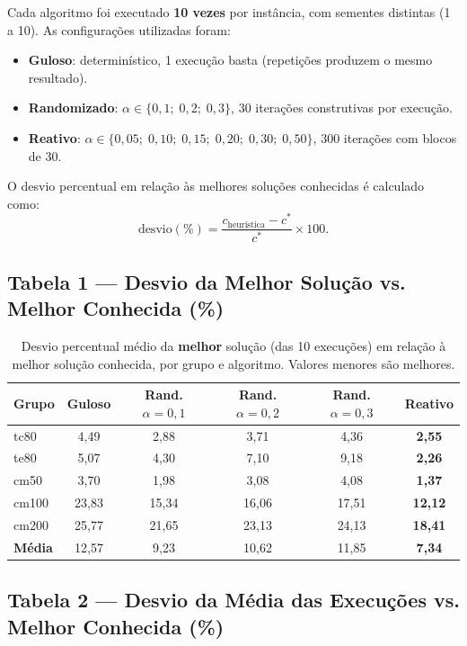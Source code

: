 \documentclass[12pt, a4paper]{article}
\begin{document}
Cada algoritmo foi executado \textbf{10 vezes} por instância, com sementes distintas (1 a 10). As configurações utilizadas foram:

\begin{itemize}
    \item \textbf{Guloso}: determinístico, 1 execução basta (repetições produzem o mesmo resultado).
    \item \textbf{Randomizado}: $\alpha \in \{0{,}1;\; 0{,}2;\; 0{,}3\}$, 30 iterações construtivas por execução.
    \item \textbf{Reativo}: $\alpha \in \{0{,}05;\; 0{,}10;\; 0{,}15;\; 0{,}20;\; 0{,}30;\; 0{,}50\}$, 300 iterações com blocos de 30.
\end{itemize}

O desvio percentual em relação às melhores soluções conhecidas \cite{ruiz2015} é calculado como:
\[
\text{desvio}(\%) = \frac{c_{\text{heurística}} - c^*}{c^*} \times 100.
\]

\subsection{Tabela 1 --- Desvio da Melhor Solução vs. Melhor Conhecida (\%)}

{\small
\begin{table}[H]
\centering
\caption{Desvio percentual médio da \textbf{melhor} solução (das 10 execuções) em relação à melhor solução conhecida, por grupo e algoritmo. Valores menores são melhores.}
\begin{tabular}{lccccc}
\toprule
\textbf{Grupo} & \textbf{Guloso} & \textbf{Rand. $\alpha{=}0{,}1$} & \textbf{Rand. $\alpha{=}0{,}2$} & \textbf{Rand. $\alpha{=}0{,}3$} & \textbf{Reativo} \\
\midrule
tc80  & 4,49 & 2,88 & 3,71 & 4,36 & \textbf{2,55} \\
te80  & 5,07 & 4,30 & 7,10 & 9,18 & \textbf{2,26} \\
cm50  & 3,70 & 1,98 & 3,08 & 4,08 & \textbf{1,37} \\
cm100 & 23,83 & 15,34 & 16,06 & 17,51 & \textbf{12,12} \\
cm200 & 25,77 & 21,65 & 23,13 & 24,13 & \textbf{18,41} \\
\midrule
\textbf{Média} & 12,57 & 9,23 & 10,62 & 11,85 & \textbf{7,34} \\
\bottomrule
\end{tabular}
\end{table}
}

\subsection{Tabela 2 --- Desvio da Média das Execuções vs. Melhor Conhecida (\%)}
\end{document}
